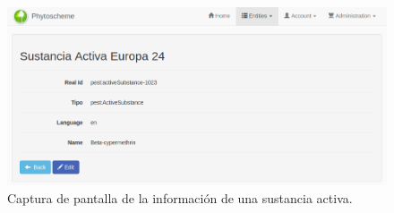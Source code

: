 \par
\begin{figure}[!h]
    \centering
    \includegraphics[width=\textwidth,height=\textheight,keepaspectratio]{Imagenes/Captura5}
    \caption{Captura de pantalla de la información de una sustancia activa.}
    \label{fig:capturaSustActDetalle}
\end{figure}
